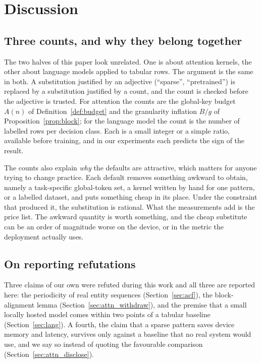 \section{Discussion}\label{sec:discussion}

\subsection{Three counts, and why they belong together}

The two halves of this paper look unrelated. One is about attention kernels, the
other about language models applied to tabular rows. The argument is the same in
both. A substitution justified by an adjective (``sparse'', ``pretrained'') is
replaced by a substitution justified by a count, and the count is checked before
the adjective is trusted. For attention the counts are the global-key budget
$A(n)$ of Definition~\ref{def:budget} and the granularity inflation $B/g$ of
Proposition~\ref{prop:block}; for the language model the count is the number of
labelled rows per decision class. Each is a small integer or a simple ratio,
available before training, and in our experiments each predicts the sign of the
result.

The counts also explain \emph{why} the defaults are attractive, which matters for
anyone trying to change practice. Each default removes something awkward to
obtain, namely a task-specific global-token set, a kernel written by hand for one
pattern, or a labelled dataset, and puts something cheap in its place. Under the
constraint that produced it, the substitution is rational. What the measurements
add is the price list. The awkward quantity is worth something, and the cheap
substitute can be an order of magnitude worse on the device, or in the metric the
deployment actually uses.

\subsection{On reporting refutations}

Three claims of our own were refuted during this work and all three are reported
here: the periodicity of real entity sequences
(Section~\ref{sec:acf}), the block-alignment lemma
(Section~\ref{sec:attn_withdraw}), and the premise that a small locally hosted
model comes within two points of a tabular baseline (Section~\ref{sec:lang}). A
fourth, the claim that a sparse pattern saves device memory and latency, survives
only against a baseline that no real system would use, and we say so instead of
quoting the favourable comparison (Section~\ref{sec:attn_disclose}).


